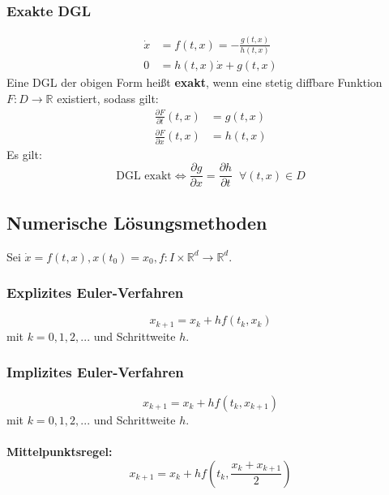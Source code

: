 \documentclass[a4paper,twocolumn,10pt]{article}
\begin{document}
\subsubsection{Exakte DGL}
\begin{equation*}
\begin{split}
\dot{x}&=f(t,x)=-\frac{g(t,x)}{h(t,x)}\\
0&=h(t,x)\dot{x}+g(t,x)
\end{split}
\end{equation*}
Eine DGL der obigen Form heißt \textbf{exakt}, wenn eine stetig diffbare Funktion $F:D\rightarrow\mathbb{R}$ existiert, sodass gilt:
\begin{equation*}
\begin{split}
\frac{\partial F}{\partial t}(t,x)&=g(t,x)\\
\frac{\partial F}{\partial x}(t,x)&=h(t,x)
\end{split}
\end{equation*}
Es gilt:
\begin{equation*}
\text{DGL exakt}\Leftrightarrow \frac{\partial g}{\partial x}=\frac{\partial h}{\partial t}\;\;\forall (t,x)\in D
\end{equation*}

\subsection{Numerische Lösungsmethoden}
Sei $\dot{x}=f(t,x),x(t_0)=x_0, f:I\times\mathbb{R}^d\rightarrow\mathbb{R}^d$.

\subsubsection{Explizites Euler-Verfahren}
\begin{equation*}
x_{k+1}=x_k+hf(t_k,x_k)
\end{equation*}
mit $k=0,1,2,...$ und Schrittweite $h$.

\subsubsection{Implizites Euler-Verfahren}
\begin{equation*}
x_{k+1}=x_k+hf(t_k,x_{k+1})
\end{equation*}
mit $k=0,1,2,...$ und Schrittweite $h$.\\\\
\textbf{Mittelpunktsregel:}
\begin{equation*}
x_{k+1}=x_k+hf\left(t_k,\frac{x_k+x_{k+1}}{2}\right)
\end{equation*}
\end{document}
